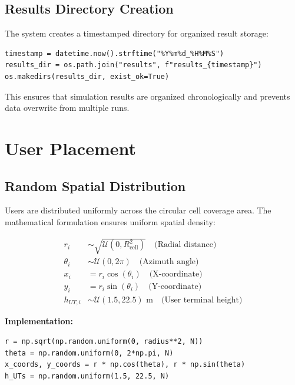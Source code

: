 \documentclass[12pt,a4paper]{article}
\begin{document}
\subsection{Results Directory Creation}

The system creates a timestamped directory for organized result storage:

\begin{lstlisting}[caption={Directory Creation}]
timestamp = datetime.now().strftime("%Y%m%d_%H%M%S")
results_dir = os.path.join("results", f"results_{timestamp}")
os.makedirs(results_dir, exist_ok=True)
\end{lstlisting}

This ensures that simulation results are organized chronologically and prevents data overwrite from multiple runs.

\section{User Placement}

\subsection{Random Spatial Distribution}

Users are distributed uniformly across the circular cell coverage area. The mathematical formulation ensures uniform spatial density:

\begin{align}
r_i &\sim \sqrt{\mathcal{U}(0, R_{\text{cell}}^2)} \quad \text{(Radial distance)} \\
\theta_i &\sim \mathcal{U}(0, 2\pi) \quad \text{(Azimuth angle)} \\
x_i &= r_i \cos(\theta_i) \quad \text{(X-coordinate)} \\
y_i &= r_i \sin(\theta_i) \quad \text{(Y-coordinate)} \\
h_{UT,i} &\sim \mathcal{U}(1.5, 22.5) \text{ m} \quad \text{(User terminal height)}
\end{align}

\textbf{Implementation:}
\begin{lstlisting}[caption={User Placement Algorithm}]
r = np.sqrt(np.random.uniform(0, radius**2, N))
theta = np.random.uniform(0, 2*np.pi, N)
x_coords, y_coords = r * np.cos(theta), r * np.sin(theta)
h_UTs = np.random.uniform(1.5, 22.5, N)
\end{lstlisting}
\end{document}
